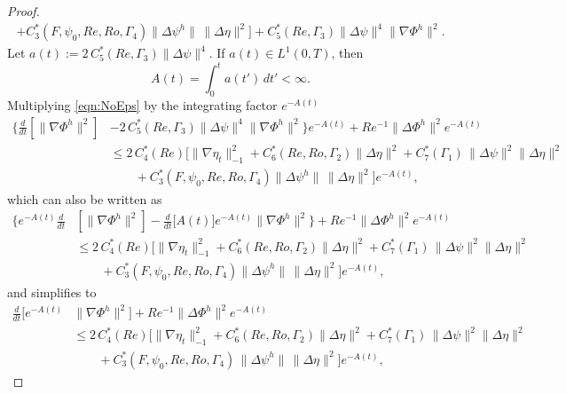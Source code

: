 \begin{proof}
\begin{equation}
\begin{split}
        + C^*_3(F,\psi_0,Re,Ro,\Gamma_4) \|\Delta \psi^h\|\,
        \|\Delta \eta\|^2\biggr] + C^*_5(Re,\Gamma_3) \|\Delta \psi\|^4 \|\nabla \Phi^h\|^2.
    \end{split}
    \label{eqn:NoEps}
  \end{equation}
  Let $a(t):= 2\,C^*_5(Re,\Gamma_3) \|\Delta \psi\|^4$. If $a(t) \in L^1(0,T)$, then
  \begin{equation}
    A(t) = \int_{0}^{t}\! a(t')\, dt' < \infty.
    \label{eqn:L4Bound}
  \end{equation}
  Multiplying \eqref{eqn:NoEps} by the integrating factor $e^{-A(t)}$
  \begin{align*}
    \biggl\{ \frac{d}{dt}\left[\|\nabla \Phi^h\|^2\right]
      &- 2\, C^*_5(Re,\Gamma_3) \|\Delta \psi\|^4 \|\nabla \Phi^h\|^2\biggr\} e^{-A(t)}
        + Re^{-1} \|\Delta \Phi^h\|^2 e^{-A(t)} \\
      & \le 2\, C^*_4(Re) \biggl[\|\nabla \eta_t\|_{-1}^2
        + C^*_6(Re,Ro,\Gamma_2) \|\Delta \eta\|^2 + C^*_7(\Gamma_1)\,
        \|\Delta \psi\|^2 \|\Delta \eta\|^2 \\
      & \qquad+ C^*_3(F,\psi_0,Re,Ro,\Gamma_4) \|\Delta \psi^h\|\, \|\Delta
        \eta\|^2\biggr] e^{-A(t)},
  \end{align*}
  which can also be written as
  \begin{align*}
    \biggl\{ e^{-A(t)}\frac{d}{dt}
      & \left[\|\nabla \Phi^h\|^2\right]
      - \frac{d}{dt}\bigl[ A(t)\bigr] e^{-A(t)} \|\nabla \Phi^h\|^2\biggr\}
      + Re^{-1} \|\Delta \Phi^h\|^2 e^{-A(t)} \\
    & \le 2\,C^*_4(Re) \biggl[\|\nabla \eta_t\|_{-1}^2
      + C^*_6(Re,Ro,\Gamma_2) \|\Delta \eta\|^2 + C^*_7(\Gamma_1)\,
      \|\Delta \psi\|^2 \|\Delta \eta\|^2 \\
    &\qquad + C^*_3(F,\psi_0,Re,Ro,\Gamma_4) \|\Delta \psi^h\|\, \|\Delta
      \eta\|^2\biggr] e^{-A(t)},
  \end{align*}
  and simplifies to
  \begin{align*}
    \frac{d}{dt}\bigl[e^{-A(t)} &\|\nabla \Phi^h\|^2\bigr]
      + Re^{-1} \|\Delta \Phi^h\|^2 e^{-A(t)} \\
    & \le 2\, C^*_4(Re) \biggl[\|\nabla \eta_t\|_{-1}^2
      + C^*_6(Re,Ro,\Gamma_2) \|\Delta \eta\|^2 + C^*_7(\Gamma_1)\,
      \|\Delta \psi\|^2 \|\Delta \eta\|^2 \\
    &\qquad + C^*_3(F,\psi_0,Re,Ro,\Gamma_4)\, \|\Delta \psi^h\|\,
      \|\Delta \eta\|^2\biggr] e^{-A(t)},
  \end{align*}

\end{proof}
